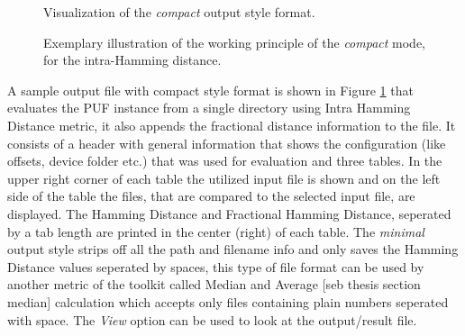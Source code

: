 \begin{figure}
\centering
{}
\caption{Visualization of the \emph{compact} output style format.}
\label{img:4_intra_compact}
\end{figure}

\begin{figure}
\centering
{}
\caption{Exemplary illustration of the working principle of the \emph{compact} mode, for the intra-Hamming distance.}
\label{img:4_intra_WP}
\end{figure}

A sample output file with compact style format is shown in Figure \ref{img:4_intra_compact} that evaluates the PUF instance from a single directory using Intra Hamming Distance metric, it also appends the fractional distance information to the file. It consists of a header with general information that shows the configuration (like offsets, device folder etc.) that was used for evaluation and three tables. In the upper right corner of each table the utilized input file is shown and on the left side of the table
the files, that are compared to the selected input file, are displayed. The Hamming Distance and Fractional Hamming Distance, seperated by a tab length are printed in the center (right) of each table. The
\emph{minimal} output style strips off all the path and filename info and only saves the Hamming Distance values seperated by spaces, this type of file format can be used by another metric of the toolkit called Median and Average [seb thesis section median] calculation which accepts only files containing plain numbers seperated with space. The \emph{View} option can be used to look at the output/result file.\\

